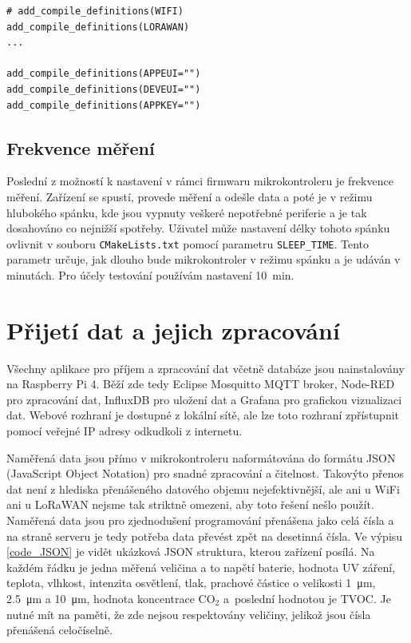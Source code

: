 \begin{lstlisting}[caption={Nastavení spojení pomocí LoRaWAN}]
# add_compile_definitions(WIFI)
add_compile_definitions(LORAWAN)
...

add_compile_definitions(APPEUI="")
add_compile_definitions(DEVEUI="")
add_compile_definitions(APPKEY="")
\end{lstlisting}

\subsection{Frekvence měření}

Poslední z možností k nastavení v rámci firmwaru mikrokontroleru je frekvence měření. Zařízení se spustí, provede měření a odešle data a poté je v režimu hlubokého spánku, kde jsou vypnuty veškeré nepotřebné periferie a je tak dosahováno co nejnižší spotřeby. Uživatel může nastavení délky tohoto spánku ovlivnit v souboru \texttt{CMakeLists.txt} pomocí parametru \texttt{SLEEP_TIME}. Tento parametr určuje, jak dlouho bude mikrokontroler v režimu spánku a je udáván v minutách. Pro účely testování používám nastavení \SI{10}{\minute}.

\section{Přijetí dat a jejich zpracování}

Všechny aplikace pro příjem a zpracování dat včetně databáze jsou nainstalovány na Raspberry Pi 4. Běží zde tedy Eclipse Mosquitto MQTT broker, Node-RED pro zpracování dat, InfluxDB pro uložení dat a Grafana pro grafickou vizualizaci dat. Webové rozhraní je dostupné z lokální sítě, ale lze toto rozhraní zpřístupnit pomocí veřejné IP adresy odkudkoli z internetu.

Naměřená data jsou přímo v mikrokontroleru naformátována do formátu JSON (JavaScript Object Notation) pro snadné zpracování a čitelnost. Takovýto přenos dat není z hlediska přenášeného datového objemu nejefektivnější, ale ani u WiFi ani u LoRaWAN nejsme tak striktně omezeni, aby toto řešení nešlo použít. Naměřená data jsou pro zjednodušení programování přenášena jako celá čísla a na straně serveru je tedy potřeba data převést zpět na desetinná čísla. Ve výpisu \ref{code_JSON} je vidět ukázková JSON struktura, kterou zařízení posílá. Na každém řádku je jedna měřená veličina a to napětí baterie, hodnota UV záření, teplota, vlhkost, intenzita osvětlení, tlak, prachové částice o velikosti \SI{1}{\micro\metre}, \SI{2.5}{\micro\metre} a \SI{10}{\micro\metre}, hodnota koncentrace CO$_2$ a~poslední hodnotou je TVOC. Je nutné mít na paměti, že zde nejsou respektovány veličiny, jelikož jsou čísla přenášená celočíselně.

